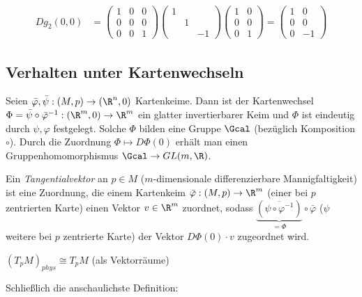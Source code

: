\begin{exmp*}
\begin{align*}
			Dg_2(0,0) &= \begin{pmatrix}
					1&0&0\\0&0&0\\0&0&1
				\end{pmatrix} 
				\begin{pmatrix}
					1 & &\\&1&\\&&-1
				\end{pmatrix}
				\begin{pmatrix}
					1&0\\0&0\\0&1
				\end{pmatrix} = 
				\begin{pmatrix}
					1&0\\0&0\\0&-1
				\end{pmatrix}
		\end{align*}
\end{exmp*}

\subsection*{Verhalten unter Kartenwechseln}
	
	Seien $ \bar{\varphi},\bar{\psi}: (M,p) \to (\R^n,0) $ Kartenkeime. Dann ist der Kartenwechsel $ \Phi = \bar{\psi} \circ \bar{\varphi}^{-1}: (\R^m,0) \to \R^m $ ein glatter invertierbarer Keim und $\Phi$ ist eindeutig durch $ \psi,\varphi $ festgelegt. Solche $\Phi$ bilden eine Gruppe $\Gcal$ (bezüglich Komposition $\circ$). Durch die Zuordnung $ \Phi \mapsto D\Phi(0) $ erhält man einen Gruppenhomomorphismus $ \Gcal \to GL(m,\R) $.

\begin{defn}
	Ein \emph{Tangentialvektor} an $p \in M$ ($m$-dimensionale differenzierbare Mannigfaltigkeit) ist eine Zuordnung, die einem Kartenkeim $ \bar{\varphi}: (M,p) \to \R^m $ (einer bei $p$ zentrierten Karte) einen Vektor $v \in \R^m$ zuordnet, sodass $ \underbrace{(\overbar{\psi \circ \varphi^{-1}})}_{=\Phi} \circ \bar{\varphi} $ ($\psi$ weitere bei $p$ zentrierte Karte) der Vektor $D\Phi(0) \cdot v$ zugeordnet wird.
\end{defn}

\begin{lem}\label{2.7}
	$ (T_pM)_{phys} \cong T_pM $ (als Vektorräume)
\end{lem}

Schließlich die anschaulichste Definition:

